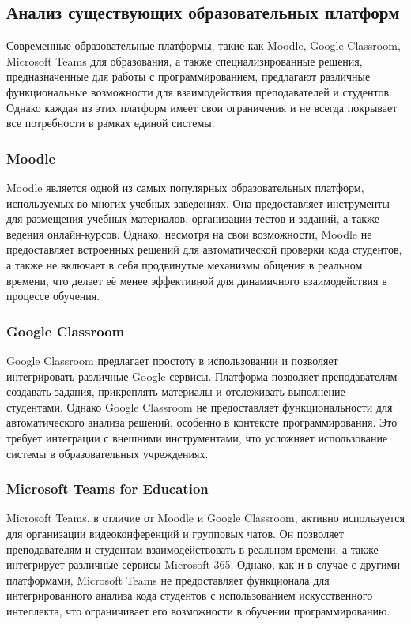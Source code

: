 \subsection{Анализ существующих образовательных платформ}

Современные образовательные платформы, такие как Moodle\cite{moodle_docs}, Google Classroom\cite{google_classroom}, Microsoft Teams для образования\cite{microsoft_teams_education}, а также специализированные решения, предназначенные для работы с программированием, предлагают различные функциональные возможности для взаимодействия преподавателей и студентов. Однако каждая из этих платформ имеет свои ограничения и не всегда покрывает все потребности в рамках единой системы.

\subsubsection{Moodle}
Moodle является одной из самых популярных образовательных платформ, используемых во многих учебных заведениях\cite{moodle_docs}. Она предоставляет инструменты для размещения учебных материалов, организации тестов и заданий, а также ведения онлайн-курсов. Однако, несмотря на свои возможности, Moodle не предоставляет встроенных решений для автоматической проверки кода студентов, а также не включает в себя продвинутые механизмы общения в реальном времени, что делает её менее эффективной для динамичного взаимодействия в процессе обучения.

\subsubsection{Google Classroom}
Google Classroom предлагает простоту в использовании и позволяет интегрировать различные Google сервисы\cite{google_classroom}. Платформа позволяет преподавателям создавать задания, прикреплять материалы и отслеживать выполнение студентами. Однако Google Classroom не предоставляет функциональности для автоматического анализа решений, особенно в контексте программирования. Это требует интеграции с внешними инструментами, что усложняет использование системы в образовательных учреждениях.

\subsubsection{Microsoft Teams for Education}
Microsoft Teams, в отличие от Moodle и Google Classroom, активно используется для организации видеоконференций и групповых чатов\cite{microsoft_teams_education}. Он позволяет преподавателям и студентам взаимодействовать в реальном времени, а также интегрирует различные сервисы Microsoft 365. Однако, как и в случае с другими платформами, Microsoft Teams не предоставляет функционала для интегрированного анализа кода студентов с использованием искусственного интеллекта, что ограничивает его возможности в обучении программированию.

